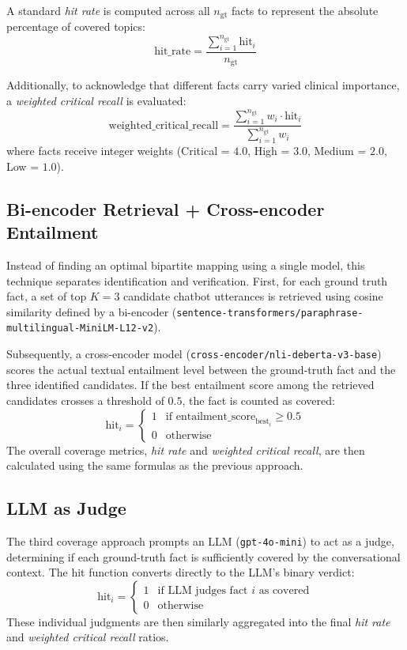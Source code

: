 A standard \textit{hit rate} is computed across all $n_{\text{gt}}$ facts to represent the absolute percentage of covered topics:
\[
\text{hit\_rate} = \frac{\sum_{i=1}^{n_{\text{gt}}} \text{hit}_i}{n_{\text{gt}}}
\]

Additionally, to acknowledge that different facts carry varied clinical importance, a \textit{weighted critical recall} is evaluated:
\[
\text{weighted\_critical\_recall} = \frac{\sum_{i=1}^{n_{\text{gt}}} w_i \cdot \text{hit}_i}{\sum_{i=1}^{n_{\text{gt}}} w_i}
\]
where facts receive integer weights (Critical = $4.0$, High = $3.0$, Medium = $2.0$, Low = $1.0$).

\subsection{Bi-encoder Retrieval + Cross-encoder Entailment}

Instead of finding an optimal bipartite mapping using a single model, this technique separates identification and verification. 
First, for each ground truth fact, a set of top $K=3$ candidate chatbot utterances is retrieved using cosine similarity defined by a bi-encoder (\texttt{sentence-transformers/paraphrase-multilingual-MiniLM-L12-v2}).

Subsequently, a cross-encoder model (\texttt{cross-encoder/nli-deberta-v3-base}) scores the actual textual entailment level between the ground-truth fact and the three identified candidates. 
If the best entailment score among the retrieved candidates crosses a threshold of $0.5$, the fact is counted as covered:
\[
\text{hit}_i = \begin{cases}
1 & \text{if } \text{entailment\_score}_{\text{best}_i} \geq 0.5 \\
0 & \text{otherwise}
\end{cases}
\]
The overall coverage metrics, \textit{hit rate} and \textit{weighted critical recall}, are then calculated using the same formulas as the previous approach.

\subsection{LLM as Judge}

The third coverage approach prompts an LLM (\texttt{gpt-4o-mini}) to act as a judge, determining if each ground-truth fact is sufficiently covered by the conversational context. 
The hit function converts directly to the LLM's binary verdict:
\[
\text{hit}_i = \begin{cases}
1 & \text{if LLM judges fact } i \text{ as covered} \\
0 & \text{otherwise}
\end{cases}
\]
These individual judgments are then similarly aggregated into the final \textit{hit rate} and \textit{weighted critical recall} ratios.


